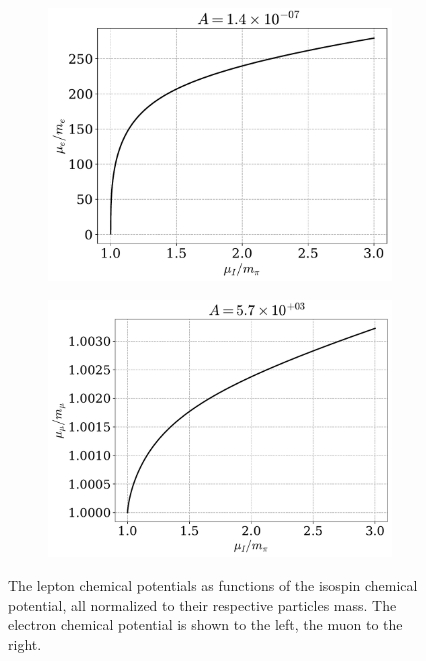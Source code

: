 \begin{figure}[!htb]
    \centering
    \begin{subfigure}{0.49 \textwidth}
        \includegraphics[width=\textwidth]{../scripts/figurer/charge_neutrality/chemical_potential_e.pdf}
    \end{subfigure}
    \begin{subfigure}{0.49\textwidth}
        \includegraphics[width=\textwidth]{../scripts/figurer/charge_neutrality/chemical_potential_mu.pdf}
    \end{subfigure} 
    \caption{
        The lepton chemical potentials as functions of the isospin chemical potential, all normalized to their respective particles mass.
        The electron chemical potential is shown to the left, the muon to the right.
    } 
    \label{fig: chemical potentials}
\end{figure}


